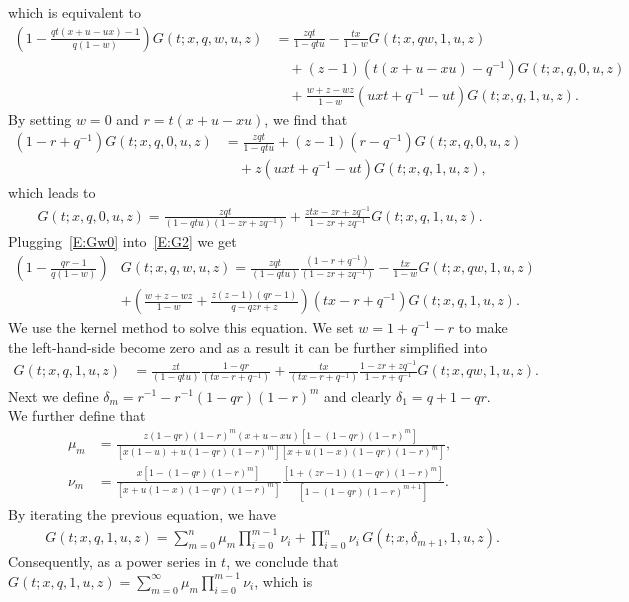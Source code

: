 \documentclass[12pt]{amsart}
\theoremstyle{plain}
\theoremstyle{definition}
\theoremstyle{example}
\theoremstyle{remark}
\numberwithin{equation}{section}
\numberwithin{figure}{section}
\begin{document}
which is equivalent to
\begin{align}\label{E:G2}
\nonumber\left(1-\frac{qt(x+u-ux)-1}{q(1-w)}\right)G(t;x,q,w,u,z)
\nonumber&=\frac{zqt}{1-qtu}-\frac{tx}{1-w}G(t;x,qw,1,u,z)\\
\nonumber&\quad+(z-1)(t(x+u-xu)-q^{-1})G(t;x,q,0,u,z)\\
&\quad+\frac{w+z-wz}{1-w}(uxt+q^{-1}-ut)G(t;x,q,1,u,z).
\end{align}
By setting $w=0$ and $r=t(x+u-xu)$, we find that
\begin{align*}
\left(1-r+q^{-1}\right)G(t;x,q,0,u,z)
&=\frac{zqt}{1-qtu}+(z-1)(r-q^{-1})G(t;x,q,0,u,z)\\
&\quad+z(uxt+q^{-1}-ut)G(t;x,q,1,u,z),
\end{align*}
which leads to
\begin{align}\label{E:Gw0}
G(t;x,q,0,u,z)=\frac{zqt}{(1-qtu)(1-zr+zq^{-1})}
+\frac{ztx-zr+zq^{-1}}{1-zr+zq^{-1}}G(t;x,q,1,u,z).
\end{align}
Plugging~\eqref{E:Gw0} into~\eqref{E:G2} we get
\begin{align*}
\left(1-\frac{qr-1}{q(1-w)}\right)&G(t;x,q,w,u,z)
=\frac{zqt}{(1-qtu)}\frac{(1-r+q^{-1})}{(1-zr+zq^{-1})}-\frac{tx}{1-w}G(t;x,qw,1,u,z)\\
&+\left(\frac{w+z-wz}{1-w}+\frac{z(z-1)(qr-1)}{q-qzr+z}\right)(tx-r+q^{-1})G(t;x,q,1,u,z).
\end{align*}
We use the kernel method to solve this equation. We set $w=1+q^{-1}-r$ to make the left-hand-side become zero  and as a result it can be further simplified into
\begin{align*}
G(t;x,q,1,u,z)&=\frac{zt}{(1-qtu)}\frac{1-qr}{(tx-r+q^{-1})}
+\frac{tx}{(tx-r+q^{-1})}\frac{1-zr+zq^{-1}}{1-r+q^{-1}}G(t;x,qw,1,u,z).
\end{align*}
Next we define $\delta_m=r^{-1}-r^{-1}(1-qr)(1-r)^m$ and clearly $\delta_1=q+1-qr$. We further define that
\begin{align*}
\mu_m&=\frac{z(1-qr)(1-r)^m(x+u-xu)[1-(1-qr)(1-r)^m]}
{[x(1-u)+u(1-qr)(1-r)^m][x+u(1-x)(1-qr)(1-r)^m]},\\
\nu_m&=\frac{x[1-(1-qr)(1-r)^m]}{[x+u(1-x)(1-qr)(1-r)^m]}
\frac{[1+(zr-1)(1-qr)(1-r)^m]}{[1-(1-qr)(1-r)^{m+1}]}.
\end{align*}
By iterating the previous equation, we have
\begin{align*}
&\quad G(t;x,q,1,u,z)=\sum_{m=0}^n\mu_m\prod_{i=0}^{m-1}\nu_i+\prod_{i=0}^{n}\nu_i \,G(t;x,\delta_{m+1},1,u,z).
\end{align*}
Consequently, as a power series in $t$, we conclude that $G(t;x,q,1,u,z)=\sum_{m=0}^{\infty}\mu_m\prod_{i=0}^{m-1}\nu_i$, which is
\end{document}
